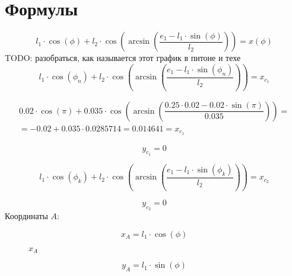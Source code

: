 \section{Формулы}

\begin{equation}\label{eq:formul}
	l_1\cdot\cos(\phi)+l_2\cdot\cos\left(\arcsin\left(\dfrac{e_1-l_1\cdot\sin(\phi)}{l_2}\right)\right)=x(\phi)
\end{equation}
TODO: разобраться, как называется этот график в питоне и техе
\newpage
\begin{equation}\label{eq:xc1}
	l_1\cdot\cos(\phi_n)+l_2\cdot\cos\left(\arcsin\left(\dfrac{e_1-l_1\cdot\sin(\phi_n)}{l_2}\right)\right)=x_{c_1}
\end{equation}

\begin{multline}\label{eq:xc1calc}
	0.02\cdot\cos(\pi)+0.035\cdot\cos\left(\arcsin\left(\dfrac{0.25\cdot 0.02-0.02\cdot\sin(\pi)}{0.035}\right)\right)=\\
	=-0.02+0.035\cdot0.0285714=0.014641=x_{c_1}
\end{multline}

\begin{equation}\label{eq:yc1}
	y_{c_1} = 0
\end{equation}

\begin{equation}\label{eq:xc2}
	l_1\cdot\cos(\phi_k)+l_2\cdot\cos\left(\arcsin\left(\dfrac{e_1-l_1\cdot\sin(\phi_k)}{l_2}\right)\right)=x_{c_2}
\end{equation}

\begin{equation}\label{eq:yc2}
	y_{c_2}=0
\end{equation}
\newpage
Координаты $ A $:

\begin{equation}\label{eq:xA}
	x_A=l_1\cdot\cos(\phi)
\end{equation}

\begin{figure}[H]
	\centering
	\caption{$ x_A $}
\end{figure}
\newpage
\begin{equation}\label{eq:yA}
	y_A=l_1\cdot\sin(\phi)
\end{equation}

